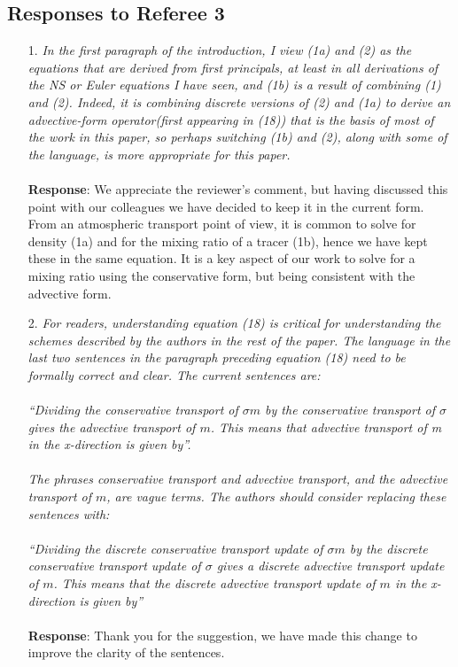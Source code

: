 \documentclass[11pt,a4paper]{article}
\begin{document}
\subsection*{Responses to Referee 3}
\begin{enumerate}[leftmargin=*]
\item[1.] \textit{In the first paragraph of the introduction, I view (1a) and (2) as the equations that are derived from first principals, at least in all derivations of the NS or Euler equations I have seen, and (1b) is a result of combining (1) and (2). Indeed, it is combining discrete versions of (2) and (1a) to derive an advective-form operator(first appearing in (18)) that is the basis of most of the work in this paper, so perhaps switching (1b) and (2), along with some of the language, is more appropriate for this paper.} \\
\\
\textbf{Response}: We appreciate the reviewer's comment, but having discussed this point with our colleagues we have decided to keep it in the current form. From an atmospheric transport point of view, it is common to solve for density (1a) and for the mixing ratio of a tracer (1b), hence we have kept these in the same equation. It is a key aspect of our work to solve for a mixing ratio using the conservative form, but being consistent with the advective form.

\item[2.] \textit{For readers, understanding equation (18) is critical for understanding the schemes described by the authors in the rest of the paper. The language in the last two sentences in the paragraph preceding equation
(18) need to be formally correct and clear. The current sentences are: \\
\\
``Dividing the conservative transport of $\sigma m$ by the conservative transport of $\sigma$ gives the advective transport
of $m$. This means that advective transport of m in the x-direction is given by''. \\
\\
The phrases conservative transport and advective transport, and the advective transport of $m$, are vague terms. The authors should consider replacing these sentences with: \\
\\
``Dividing the discrete conservative transport update of $\sigma m$ by the discrete conservative transport update of $\sigma$ gives a discrete advective transport update of $m$. This means that the discrete advective transport update of $m$ in the x-direction is given by''} \\
\\
\textbf{Response}: Thank you for the suggestion, we have made this change to improve the clarity of the sentences.


\end{enumerate}
\end{document}
